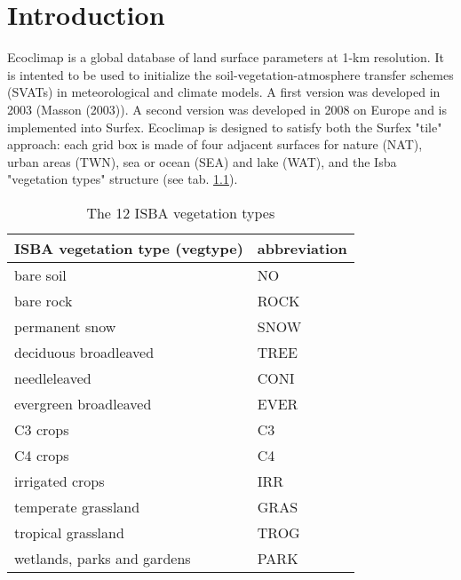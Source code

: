 
\chapter{Introduction}
\minitoc


Ecoclimap is a global database of land surface parameters at 1-km resolution. 
It is intented to be used to initialize the soil-vegetation-atmosphere transfer schemes (SVATs) 
in meteorological and climate models. A first version was developed in 2003 (Masson \etal (2003)\nocite{masson_2003}). A second version was developed in 2008 on Europe and is implemented into Surfex. 
Ecoclimap is designed to satisfy both the Surfex "tile" approach: each grid box is made of four adjacent surfaces for nature (NAT), urban areas (TWN), sea or ocean (SEA) and lake (WAT), and the Isba "vegetation types" structure (see tab. \ref{tab1}).\\ 


\begin{table}[h]
\begin{center}
\begin{tabular}{|l|l|}
\hline
\textbf{ISBA vegetation type (vegtype)} & \textbf{abbreviation} \\
\hline
bare soil & NO \\
\hline
bare rock & ROCK \\
\hline
permanent snow & SNOW \\
\hline 
deciduous broadleaved & TREE \\
\hline
needleleaved & CONI \\
\hline
evergreen broadleaved & EVER \\
\hline
C3 crops & C3 \\
\hline
C4 crops & C4 \\
\hline
irrigated crops & IRR \\
\hline
temperate grassland & GRAS \\
\hline
tropical grassland & TROG \\
\hline
wetlands, parks and gardens & PARK \\
\hline
\end{tabular}
\end{center}
\caption{The 12 ISBA vegetation types}
\label{tab1}
\end{table}

